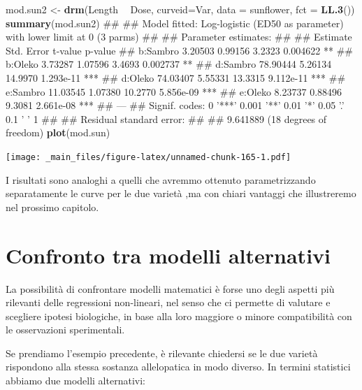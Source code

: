 \documentclass[a4paper,12pt,oneside]{book}
\newenvironment{Shaded}{\begin{snugshade}}{\end{snugshade}}
\newcommand{\KeywordTok}[1]{\textcolor[rgb]{0.13,0.29,0.53}{\textbf{#1}}}
\newcommand{\DataTypeTok}[1]{\textcolor[rgb]{0.13,0.29,0.53}{#1}}
\newcommand{\StringTok}[1]{\textcolor[rgb]{0.31,0.60,0.02}{#1}}
\newcommand{\OperatorTok}[1]{\textcolor[rgb]{0.81,0.36,0.00}{\textbf{#1}}}
\newcommand{\NormalTok}[1]{#1}
\theoremstyle{definition}
\theoremstyle{definition}
\theoremstyle{definition}
\theoremstyle{remark}
\begin{document}
\begin{Shaded}
\begin{Highlighting}[]
\NormalTok{mod.sun2 <-}\StringTok{ }\KeywordTok{drm}\NormalTok{(Length }\OperatorTok{~}\StringTok{ }\NormalTok{Dose, }\DataTypeTok{curveid=}\NormalTok{Var, }\DataTypeTok{data =}\NormalTok{ sunflower, }\DataTypeTok{fct =} \KeywordTok{LL.3}\NormalTok{())}
\KeywordTok{summary}\NormalTok{(mod.sun2)}
\NormalTok{## }
\NormalTok{## Model fitted: Log-logistic (ED50 as parameter) with lower limit at 0 (3 parms)}
\NormalTok{## }
\NormalTok{## Parameter estimates:}
\NormalTok{## }
\NormalTok{##           Estimate Std. Error t-value   p-value    }
\NormalTok{## b:Sambro   3.20503    0.99156  3.2323  0.004622 ** }
\NormalTok{## b:Oleko    3.73287    1.07596  3.4693  0.002737 ** }
\NormalTok{## d:Sambro  78.90444    5.26134 14.9970 1.293e-11 ***}
\NormalTok{## d:Oleko   74.03407    5.55331 13.3315 9.112e-11 ***}
\NormalTok{## e:Sambro  11.03545    1.07380 10.2770 5.856e-09 ***}
\NormalTok{## e:Oleko    8.23737    0.88496  9.3081 2.661e-08 ***}
\NormalTok{## ---}
\NormalTok{## Signif. codes:  0 '***' 0.001 '**' 0.01 '*' 0.05 '.' 0.1 ' ' 1}
\NormalTok{## }
\NormalTok{## Residual standard error:}
\NormalTok{## }
\NormalTok{##  9.641889 (18 degrees of freedom)}
\KeywordTok{plot}\NormalTok{(mod.sun)}
\end{Highlighting}
\end{Shaded}

\texttt{[image: \_main\_files/figure-latex/unnamed-chunk-165-1.pdf]}

I risultati sono analoghi a quelli che avremmo ottenuto parametrizzando
separatamente le curve per le due varietà ,ma con chiari vantaggi che
illustreremo nel prossimo capitolo.

\section{Confronto tra modelli
alternativi}\label{confronto-tra-modelli-alternativi}

La possibilità di confrontare modelli matematici è forse uno degli
aspetti più rilevanti delle regressioni non-lineari, nel senso che ci
permette di valutare e scegliere ipotesi biologiche, in base alla loro
maggiore o minore compatibilità con le osservazioni sperimentali.

Se prendiamo l'esempio precedente, è rilevante chiedersi se le due
varietà rispondono alla stessa sostanza allelopatica in modo diverso. In
termini statistici abbiamo due modelli alternativi:
\end{document}
